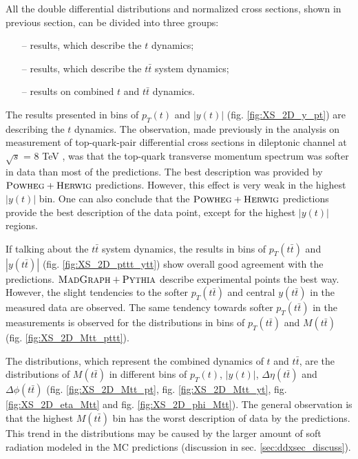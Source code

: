 All the double differential distributions and normalized cross sections, shown in previous section, can be divided into three groups:

\begin{itemize}
 \item [--] results, which describe the $t$ dynamics;
 \item [--] results, which describe the $t\bar{t}$ system dynamics;
 \item [--] results on combined $t$  and $t\bar{t}$ dynamics.
\end{itemize}

The results presented in bins of $p_{T}(t)$ and $|y(t)|$ (fig. \ref{fig:XS_2D_y_pt}) are describing the $t$
dynamics. The observation, made previously in the analysis on measurement of top-quark-pair differential cross sections in dileptonic channel at 
$\sqrt{s}$ = 8 TeV \cite{Asin2014Auth}, was that the top-quark transverse momentum spectrum was softer in data than most of the predictions. The best
description was provided by $\textsc{Powheg}+\textsc{Herwig}$ predictions. However, this effect is very weak in the highest $|y(t)|$ bin. One can also conclude that the $\textsc{Powheg}+\textsc{Herwig}$
predictions provide the best description of the data point, except for the highest $|y(t)|$ regions.

If talking about the $t\bar{t}$ system dynamics, the results in bins of $p_{T}(t\bar{t})$ and $|y(t\bar{t})|$ (fig. \ref{fig:XS_2D_pttt_ytt})
show overall good agreement with the predictions. $\textsc{MadGraph}+\textsc{Pythia}$ describe experimental points the best way. However, the slight tendencies to the softer $p_{T}(t\bar{t})$
and central $y(t\bar{t})$ in the measured data are observed. The same tendency towards softer $p_{T}(t\bar{t})$ in the measurements is observed for the distributions 
in bins of $p_{T}(t\bar{t})$ and $M(t\bar{t})$ (fig. \ref{fig:XS_2D_Mtt_pttt}).

The distributions, which represent the combined dynamics of $t$ and $t\bar{t}$, are the distributions of $M(t\bar{t})$ in different bins of $p_{T}(t)$, $|y(t)|$,
$\Delta\eta(t\bar{t})$ and $\Delta\phi(t\bar{t})$ (fig. \ref{fig:XS_2D_Mtt_pt}, fig. \ref{fig:XS_2D_Mtt_yt}, fig. \ref{fig:XS_2D_eta_Mtt}
and fig. \ref{fig:XS_2D_phi_Mtt}). The general observation is that the highest $M(t\bar{t})$ bin has the worst description of data by the predictions. This 
trend in the distributions may be caused by the larger amount of soft radiation modeled in the MC predictions (discussion in sec. \ref{sec:ddxsec_discuss}).